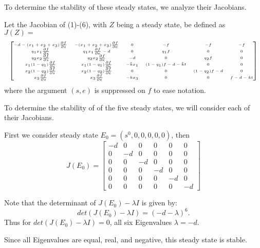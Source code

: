 \documentclass[12pt]{article}
\begin{document}
\noindent To determine the stability of these steady states, we analyze their Jacobians. 

\noindent Let the Jacobian of (1)-(6), with $Z$ being a steady state, be defined as\\ $J(Z)=$
\[ 
\tiny
\begin{bmatrix}
-d-(x_1 +x_2+x_3)\frac{\partial f}{\partial s} & -(x_1+x_2+x_3)\frac{\partial f}{\partial e} & 0 & -f & -f & -f\\
q_1 x_1 \frac{\partial f}{\partial s} & q_1 x_1 \frac{\partial f}{\partial e}-d & 0 & q_1 f & 0 & 0 \\
q_2 x_2 \frac{\partial f}{\partial s} & q_2 x_2 \frac{\partial f}{\partial e} & -d & 0 & q_2 f & 0 \\
x_1 (1-q_1)\frac{\partial f}{\partial s} & x_1(1-q_1)\frac{\partial f}{\partial e} & -\tilde{k} x_1 & (1-q_1) f-d-\tilde{k}t & 0 & 0 \\
x_2 (1-q_2) \frac{\partial f}{\partial s} & x_2(1-q_2)\frac{\partial f}{\partial e} & 0 & 0 & (1-q_2) f-d & 0 \\
x_3 \frac{\partial f}{\partial s} & x_3 \frac{\partial f}{\partial e} & -k x_3 & 0 & 0 & f-d-kt
\end{bmatrix}
\]
where the argument $(s,e)$ is suppressed on $f$ to ease notation. 


\noindent To determine the stability of of the five steady states, we will consider each of their Jacobians.

\noindent First we consider steady state $E_0=(s^0,0,0,0,0,
0)$, then\\  
\[ J(E_0)=
\begin{bmatrix}
-d & 0 & 0 & 0 & 0 & 0\\
0 & -d & 0 & 0 & 0 & 0\\
0 & 0 & -d & 0 & 0 & 0 \\
0 & 0 & 0 & -d & 0 & 0 \\
0 &0 & 0 & 0 & -d & 0 \\
0 & 0 & 0 & 0 & 0 & -d
\end{bmatrix}
\]

\noindent Note that the determinant of $J(E_0)-\lambda I$ is given by: $$det(J(E_0)-\lambda I)=(-d-\lambda)^6.$$ Thus for $det(J(E_0)-\lambda I)=0$, all six Eigenvalues $\lambda = -d$. 

\noindent Since all Eigenvalues are equal, real, and negative, this steady state is stable.  
\end{document}

